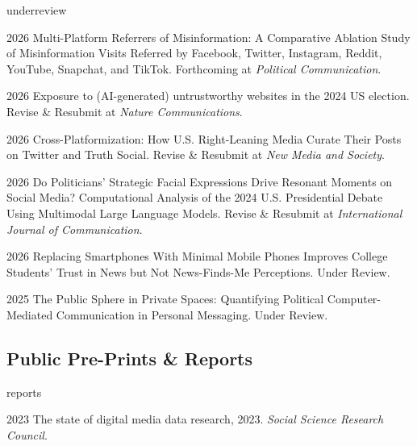 \begin{publist}{underreview}

  {2026}
  {Multi-Platform Referrers of Misinformation: A Comparative Ablation Study of Misinformation Visits Referred by Facebook, Twitter, Instagram, Reddit, YouTube, Snapchat, and TikTok.}
  {Forthcoming at \textit{Political Communication}.}
  {}

  {2026}
  {Exposure to (AI-generated) untrustworthy websites in the 2024 US election.}
  {Revise \& Resubmit at \textit{Nature Communications}. }
  {}

  {2026}
  {Cross-Platformization: How U.S. Right-Leaning Media Curate Their Posts on Twitter and Truth Social.}
  {Revise \& Resubmit at \textit{New Media and Society}.}
  {}

  {2026}
  {Do Politicians' Strategic Facial Expressions Drive Resonant Moments on Social Media? Computational Analysis of the 2024 U.S. Presidential Debate Using Multimodal Large Language Models.}
  {Revise \& Resubmit at \textit{International Journal of Communication}.}
  {}

  {2026}
  {Replacing Smartphones With Minimal Mobile Phones Improves College Students' Trust in News but Not News-Finds-Me Perceptions.}
  {Under Review.}
  {}

  {2025}
  {The Public Sphere in Private Spaces: Quantifying Political Computer-Mediated Communication in Personal Messaging.}
  {Under Review. }
  {}

\end{publist}

\subsection{Public Pre-Prints \& Reports}

\begin{publist}{reports}

  {2023}
  {The state of digital media data research, 2023.}
  {\textit{Social Science Research Council}. }
  {}

\end{publist}
